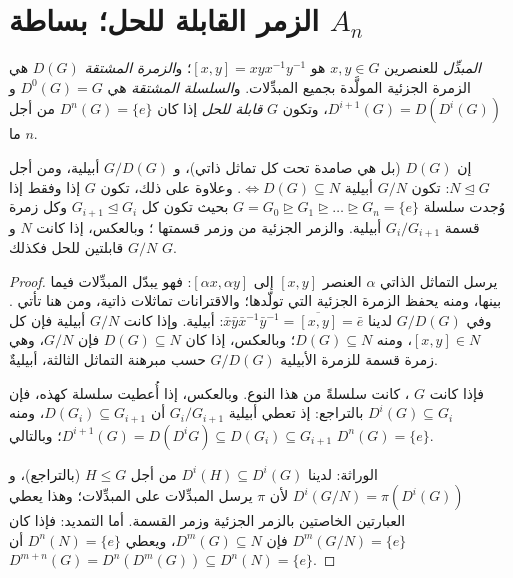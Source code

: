 \section{الزمر القابلة للحل؛ بساطة \texorpdfstring{$A_n$}{An}}

\begin{definition}\label{def:b3:groups:derived}
\emph{المبدِّل} للعنصرين $x, y \in G$ هو $[x,y]
= xyx^{-1}y^{-1}$؛
و\emph{الزمرة المشتقة} $D(G)$ هي الزمرة الجزئية
المولَّدة بجميع المبدِّلات. و\emph{السلسلة المشتقة} هي
$D^0(G) = G$ و $D^{i+1}(G) = D(D^i(G))$، وتكون $G$ \emph{قابلة
للحل} إذا كان $D^n(G) =
\{e\}$ من أجل $n$ ما.
\end{definition}

\begin{proposition}\label{prop:b3:groups:derived}
إن $D(G)$  (بل هي صامدة تحت كل تماثل ذاتي)، و $G/D(G)$
أبيلية، ومن أجل $N \trianglelefteq G$: تكون $G/N$ أبيلية $\iff
D(G) \subseteq N$. وعلاوة على
ذلك، تكون $G$  إذا وفقط إذا وُجدت سلسلة $G = G_0 \trianglerighteq G_1 \trianglerighteq \dots
\trianglerighteq G_n = \{e\}$ بحيث
تكون كل $G_{i+1} \trianglelefteq
G_i$ وكل زمرة قسمة $G_i/G_{i+1}$ أبيلية. والزمر
الجزئية من  وزمر قسمتها ؛ وبالعكس، إذا
كانت $N$ و $G/N$ قابلتين للحل فكذلك $G$.
\end{proposition}

\begin{proof}
يرسل التماثل الذاتي $\alpha$ العنصر $[x,y]$ إلى $[\alpha x, \alpha y]$: فهو
يبدّل المبدِّلات فيما بينها، ومنه يحفظ الزمرة الجزئية التي تولّدها؛
والاقترانات تماثلات ذاتية، ومن هنا تأتي . وفي $G/D(G)$
لدينا $\bar x\bar y \bar x^{-1}\bar y^{-1} = \overline{[x,y]} = \bar e$:  أبيلية. وإذا كانت $G/N$ أبيلية فإن
كل $[x,y] \in
N$، ومنه $D(G) \subseteq N$؛ وبالعكس، إذا كان $D(G) \subseteq N$ فإن $G/N$،
وهي زمرة قسمة للزمرة الأبيلية $G/D(G)$ حسب مبرهنة التماثل
الثالثة، أبيليةٌ.

فإذا كانت $G$ ، كانت  سلسلةً من هذا
النوع. وبالعكس، إذا أُعطيت سلسلة كهذه، فإن $D^i(G) \subseteq G_i$ بالتراجع: إذ
تعطي أبيلية $G_i/G_{i+1}$ أن $D(G_i) \subseteq G_{i+1}$، ومنه $D^{i+1}(G) = D(D^i G)
\subseteq D(G_i) \subseteq G_{i+1}$؛ وبالتالي
$D^n(G) = \{e\}$.

الوراثة: لدينا $D^i(H) \subseteq D^i(G)$ من أجل $H \leq G$ (بالتراجع)، و $D^i(G/N) = \pi(D^i(G))$
لأن $\pi$ يرسل المبدِّلات على المبدِّلات؛ وهذا يعطي العبارتين
الخاصتين بالزمر الجزئية وزمر القسمة. أما التمديد: فإذا كان
$D^m(G/N) = \{e\}$ فإن $D^m(G) \subseteq N$، ويعطي $D^n(N) = \{e\}$ أن $D^{m+n}(G) = D^n(D^m(G)) \subseteq D^n(N)
= \{e\}$.
\end{proof}


